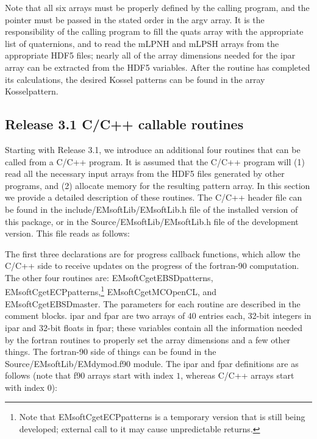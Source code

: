 \documentclass[DIV=calc, paper=letter, fontsize=11pt]{scrartcl}	 %
\begin{document}
Note that all six arrays must be properly defined by the calling program, and the pointer must be passed in the stated order in the \textsf{argv} array.   It is 
the responsibility of the calling program to fill the \textsf{quats} array with the appropriate list of quaternions, and to read the \textsf{mLPNH} and
\textsf{mLPSH} arrays from the appropriate HDF5 files; nearly all of the array dimensions needed for the \textsf{ipar} array can be
extracted from the HDF5 variables.  After the routine has completed its calculations, the desired Kossel patterns can be found in the array \textsf{Kosselpattern}.

\subsection{Release 3.1 C/C++ callable routines}
Starting with Release 3.1, we introduce an additional four routines that can be called from a C/C++ program.  It is assumed that 
the C/C++ program will (1) read all the necessary input arrays from the HDF5 files generated by other programs, and (2) allocate
memory for the resulting pattern array.  In this section we provide a detailed description of these routines.  The C/C++ header file
can be found in the \textsf{include/EMsoftLib/EMsoftLib.h} file of the installed version of this package, or in the  \textsf{Source/EMsoftLib/EMsoftLib.h} 
file of the development version.  This file reads as follows:


The first three declarations are for progress callback functions, which allow the C/C++ side to receive updates on the progress of the fortran-90 computation.
The other four routines are: \textsf{EMsoftCgetEBSDpatterns}, \textsf{EMsoftCgetECPpatterns},\footnote{Note that \textsf{EMsoftCgetECPpatterns} is a 
temporary version that is still being developed; external call to it may cause unpredictable returns.} \textsf{EMsoftCgetMCOpenCL}, and \textsf{EMsoftCgetEBSDmaster}.
The parameters for each routine are described in the comment blocks.  \textsf{ipar} and \textsf{fpar} are two arrays of $40$ entries each, 32-bit integers in \textsf{ipar}
and 32-bit floats in \textsf{fpar}; these variables contain all the information needed by the fortran routines to properly set the array dimensions and a few other things.
The fortran-90 side of things can be found in the \textsf{Source/EMsoftLib/EMdymod.f90} module.  The \textsf{ipar} and \textsf{fpar} definitions are as follows (note that 
f90 arrays start with index $1$, whereas C/C++ arrays start with index $0$):
\end{document}
